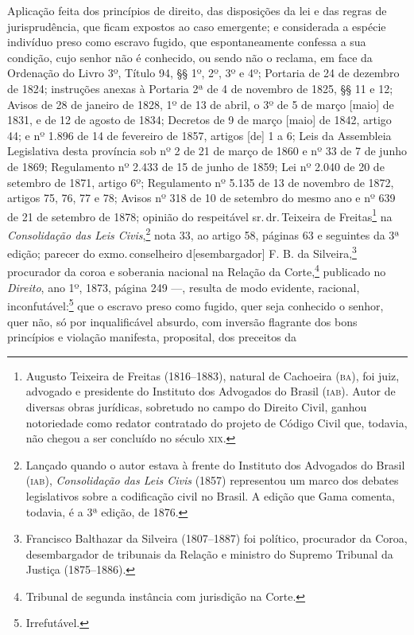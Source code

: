 Aplicação feita dos princípios de direito, das disposições da lei e das
regras de jurisprudência, que ficam expostos ao caso emergente; e
considerada a espécie indivíduo preso como escravo fugido, que
espontaneamente confessa a sua condição, cujo senhor não é conhecido, ou
sendo não o reclama, em face da Ordenação do Livro 3º, Título 94, §§ 1º,
2º, 3º e 4º; Portaria de 24 de dezembro de 1824; instruções anexas à
Portaria 2ª de 4 de novembro de 1825, §§ 11 e 12; Avisos de 28 de
janeiro de 1828, 1º de 13 de abril, o 3º de 5 de março {[}maio{]} de
1831, e de 12 de agosto de 1834; Decretos de 9 de março {[}maio{]} de
1842, artigo 44; e nº 1.896 de 14 de fevereiro de 1857, artigos {[}de{]}
1 a 6; Leis da Assembleia Legislativa desta província sob nº 2 de 21 de
março de 1860 e nº 33 de 7 de junho de 1869; Regulamento nº 2.433 de 15
de junho de 1859; Lei nº 2.040 de 20 de setembro de 1871, artigo 6º;
Regulamento nº 5.135 de 13 de novembro de 1872, artigos 75, 76, 77 e 78;
Avisos nº 318 de 10 de setembro do mesmo ano e nº 639 de 21 de setembro
de 1878; opinião do respeitável sr.\,dr.\,Teixeira de Freitas\footnote{
  Augusto Teixeira de Freitas (1816--1883), natural de Cachoeira (\textsc{ba}),
  foi juiz, advogado e presidente do Instituto dos Advogados do Brasil
  (\textsc{iab}). Autor de diversas obras jurídicas, sobretudo no campo do
  Direito Civil, ganhou notoriedade como redator contratado do projeto
  de Código Civil que, todavia, não chegou a ser concluído no século \textsc{xix}.}
na \emph{Consolidação das Leis Civis},\footnote{Lançado quando o autor
  estava à frente do Instituto dos Advogados do Brasil (\textsc{iab}),
  \emph{Consolidação das Leis Civis} (1857) representou um marco dos
  debates legislativos sobre a codificação civil no Brasil. A edição que
  Gama comenta, todavia, é a 3ª edição, de 1876.} nota 33, ao artigo
58, páginas 63 e seguintes da 3ª edição; parecer do exmo.\,conselheiro
d{[}esembargador{]} F. B. da Silveira,\footnote{Francisco Balthazar
  da Silveira (1807--1887) foi político, procurador da Coroa,
  desembargador de tribunais da Relação e ministro do Supremo Tribunal
  da Justiça (1875--1886).} procurador da coroa e soberania nacional na
Relação da Corte,\footnote{Tribunal de segunda instância com jurisdição
  na Corte.} publicado no \emph{Direito}, ano 1º, 1873, página 249
---, resulta de modo evidente, racional, inconfutável:\footnote{
  Irrefutável.} que o escravo preso como fugido, quer seja conhecido o
senhor, quer não, só por inqualificável absurdo, com inversão flagrante
dos bons princípios e violação manifesta, proposital, dos preceitos da
